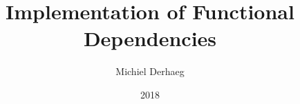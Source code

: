\documentclass[]{article}
\author{Michiel Derhaeg}
\title{Implementation of Functional Dependencies}
\date{2018}
\begin{document}
\maketitle
\tableofcontents
















%

{}

\end{document}
